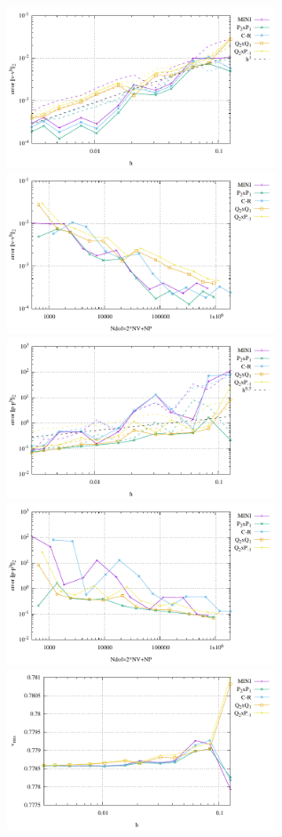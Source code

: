 \begin{center}
\includegraphics[width=8cm]{python_codes/fieldstone_112/results/exp5_avrg/errors_V.pdf}
\includegraphics[width=8cm]{python_codes/fieldstone_112/results/exp5_avrg/errors_V_ndof.pdf}\\
\includegraphics[width=8cm]{python_codes/fieldstone_112/results/exp5_avrg/errors_P.pdf}
\includegraphics[width=8cm]{python_codes/fieldstone_112/results/exp5_avrg/errors_P_ndof.pdf}\\
\includegraphics[width=8cm]{python_codes/fieldstone_112/results/exp5_avrg/vrms.pdf}

\end{center}
